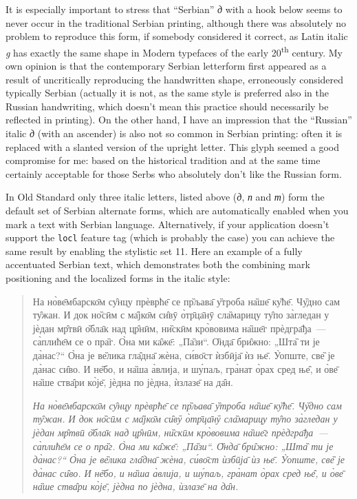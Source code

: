 \documentclass[12pt,a4paper,openany]{book}
\begin{document}
It is especially important to stress that “Serbian” \textit{д} with a hook
below seems to never occur in the traditional Serbian printing, although
there was absolutely no problem to reproduce this form, if somebody
considered it correct, as Latin italic \textit{g} has exactly the same
shape in Modern typefaces of the early 20\textsuperscript{th} century. My
own opinion is that the contemporary Serbian letterform first appeared as a
result of uncritically reproducing the handwritten shape, erroneously
considered typically Serbian (actually it is not, as the same style is
preferred also in the Russian handwriting, which doesn’t mean this practice
should necessarily be reflected in printing). On the other hand, I have an
impression that the “Russian” italic \textit{д} (with an ascender) is also
not so common in Serbian printing: often it is replaced with a slanted
version of the upright letter. This glyph seemed a good compromise for me:
based on the historical tradition and at the same time certainly acceptable
for those Serbs who absolutely don’t like the Russian form.

In Old Standard only three italic letters, listed above (\textit{д},
\textit{п} and \textit{т}) form the default set of Serbian alternate forms,
which are automatically enabled when you mark a text with Serbian language.
Alternatively, if your application doesn’t support the \texttt{locl}
feature tag (which is probably the case) you can achieve the same result by
enabling the stylistic set 11. Here an example of a fully accentuated 
Serbian text, which demonstrates both the combining mark positioning and
the localized forms in the italic style:

\begin{quote}
\large

На но̀ве̄мбарско̄м су̑нцу прѐврће̄ се пр̏љава̄ у̏троба на̏ше̄ ку̏ће̄. Чу̏дно сам ту̑жан.
И док но̏сӣм с ма̑јко̄м си̑вӯ о̀тр̄ца̄нӯ сла̏марицу ту̑по за̀гледан у јѐдан мр̑твӣ
о̏бла̄к над цр̑нӣм, ни̏скӣм кро̀во\-вима на̏ше̄г прѐдгра̄ђа~— са̀плиће̄м се о пра̏г. О̀на
ми ка̑же̄: „Па̏зи“. О̏нда̄ бри̑жно: „Шта̏ ти је да̀нас?“ О̀на је ве̏лика гла̑дна̄ жѐна,
си́во̄ст ѝзбӣја̄ ѝз ње̄. У̀опште, све̏ је да̀нас си̑во. И не̏бо, и на̏ша а̀влија, и
шу́паљ, гра̀нат о̀рах сред ње̑, и о̀ве̄ на̏ше ства̑ри ко̀је̄, јѐдна по јѐдна, ѝзлазе̄
на да̑н.

\smallskip

\itshape
На но̀ве̄мбарско̄м су̑нцу прѐврће̄ се пр̏љава̄ у̏троба на̏ше̄ ку̏ће̄. Чу̏дно сам ту̑жан.
И док но̏сӣм с ма̑јко̄м си̑вӯ о̀тр̄ца̄нӯ сла̏ма\-рицу ту̑по за̀гледан у јѐдан мр̑твӣ
о̏бла̄к над цр̑нӣм, ни̏скӣм кро̀вовима на̏ше̄г прѐдгра̄ђа~— са̀плиће̄м се о пра̏г. О̀на
ми ка̑же̄: „Па̏зи“. О̏нда̄ бри̑жно: „Шта̏ ти је да̀нас?“ О̀на је ве̏лика гла̑д\-на̄ жѐна,
си́во̄ст ѝзбӣја̄ ѝз ње̄. У̀опште, све̏ је да̀нас си̑во. И не̏бо, и на̏ша а̀влија, и
шу́паљ, гра̀нат о̀рах сред ње̑, и о̀ве̄ на̏ше ства̑ри ко̀је̄, јѐдна по јѐдна, ѝзлазе̄
на да̑н.

\end{quote}
\end{document}

